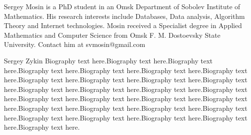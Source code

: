 \documentclass[10pt,journal,cspaper,compsoc]{IEEEtran}
\begin{document}

\newpage

\begin{IEEEbiographynophoto}{Sergey Mosin}
is a PhD student in an Omsk Department of Sobolev Institute of Mathematics. His
research interests include Databases, Data analysis, Algorithm Theory and
Internet technologies. Mosin received a Specialist degree in Applied Mathematics
and Computer Science from Omsk F. M. Dostoevsky State University. Contact him at
svmosin@gmail.com
\end{IEEEbiographynophoto}


\begin{IEEEbiographynophoto}{Sergey Zykin}
Biography text here.Biography text here.Biography text here.Biography text here.Biography text here.Biography text here.Biography text here.Biography text here.Biography text here.Biography text here.Biography text here.Biography text here.Biography text here.Biography text here.Biography text here.Biography text here.Biography text here.Biography text here.Biography text here.Biography text here.Biography text here.Biography text here.Biography text here.Biography text here.Biography text here.Biography text here.Biography text here.Biography text here.
\end{IEEEbiographynophoto}


\vfill




\end{document}
